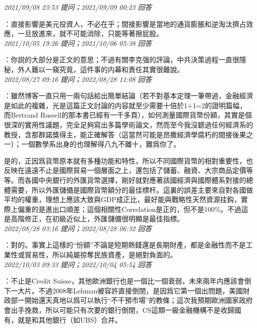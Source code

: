 \documentclass[twocolumn]{ctexart}
\begin{document}
\textit{\hfill\noindent\small 2021/09/08 23:53 提问；2021/09/09 00:23 回答}

：直接影響是美元投資人，不必在乎；間接影響是當地的通貨膨脹和逆淘汰擠占效應，一旦放進來，就不可能消除，只能等著擦屁股。
\\

\textit{\hfill\noindent\small 2021/10/05 19:26 提问；2021/10/06 05:38 回答}

：你説的大部分是正文的意思；不過有關李克强的評論，中共決策過程一直很隱秘，外人難以一窺究竟，這件事的内幕和責任其實很難說。
\\

\textit{\hfill\noindent\small 2022/08/27 09:16 提问；2022/08/28 11:08 回答}

：雖然博客一直只用一兩句話給出簡單結論（若不對基本定理一筆帶過，金融經濟是如此的複雜，光是這篇正文討論的内容就至少需要十倍於1+1=2的證明篇幅，而Bertrand Russell的那本書已經有一千多頁），如何測量國際貨幣份額，其實是個很深的實用性議題，完全足夠寫出多篇學術論文，然而至今我沒聼過任何經濟系的教授，含那群諾獎得主，能正確解答（這當然可能是昂撒經濟學腐朽的間接後果之一）；一個數學系出身的也理解得八九不離十，難爲你了。

是的，正因爲貨幣原本就有多種功能和特性，所以不同國際貨幣的相對重要性，也反映在遠遠不止是國際貿易一個層面之上，還包括了儲蓄、融資、大宗商品定價等等。而各國中央銀行的外匯貨幣選擇，剛好就對應著該國經濟與國際體系對接的總體需要，所以外匯儲備是國際貨幣額分的最佳標杆。這裏的誤差主要來自對各國做平均的權重，理想上應該大致與GDP成正比，最好能與戰略性天然資源挂鈎，實際上偏重的是進出口順差；這個相關性Correlation是正的，但不是100\%。不過這是高階修正，在初級近似上，外匯儲備很明顯是最佳指標。
\\

\textit{\hfill\noindent\small 2022/08/28 03:16 提问；2022/08/28 06:32 回答}

：對的。事實上這樣的“份額”不論是短期熱錢還是長期財產，都是金融性而不是工業性或貿易性，所以純屬掠奪民族資產，是絕對負面的。
\\

\textit{\hfill\noindent\small 2022/10/03 09:33 提问；2022/10/04 05:54 回答}

：不止是Credit Suisse，其他歐洲銀行也是一個比一個衰弱，未來兩年内應該會倒下一大片。不過2008年Lehman被容許直接倒閉，是因爲它第一個出問題，美國財政部一開始還天真地以爲可以執行“不干預市場”的教條；這次我預期歐洲國家政府會出手挽救，所以可能只有次要的銀行倒閉，CS這類一級金融機構不是收歸國有，就是和其他銀行（如UBS）合并。
\end{document}
